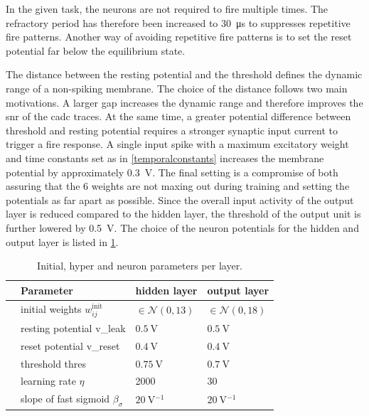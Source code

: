 In the given task, the neurons are not required to fire multiple times. The refractory period has therefore been increased to \SI{30}{\micro \s} to suppresses repetitive fire patterns. Another way of avoiding repetitive fire patterns is to set the reset potential far below the equilibrium state.

The distance between the resting potential and the threshold defines the dynamic range of a non-spiking membrane. The choice of the distance follows two main motivations. A larger gap increases the dynamic range and therefore improves the \gls{snr} of the \gls{cadc} traces. At the same time, a greater potential difference between threshold and resting potential requires a stronger synaptic input current to trigger a fire response. A single input spike with a maximum excitatory weight and time constants set as in \cref{temporalconstants} increases the membrane potential by approximately \SI{0.3}{\V}. The final setting is a compromise of both assuring that the \SI{6}{\bit} weights are not maxing out during training and setting the potentials as far apart as possible. Since the overall input activity of the output layer is reduced compared to the hidden layer, the threshold of the output unit is further lowered by \SI{0.5}{\V}. The choice of the neuron potentials for the hidden and output layer is listed in \cref{initparameters}.

\begin{table}[htb!]\centering{}
	\begin{tabular}{@{}rlll@{}}\toprule
		& Parameter								& 	hidden layer 			& 	output layer \\ \midrule
		& initial weights $w_{ij}^\text{init}$	& 	$\in \mathcal{N}(0,13)$ & 	$\in \mathcal{N}(0,18)$\\
		& resting potential \gls{v_leak}		&	$\SI{0.5}{\V}$ 			& 	$\SI{0.5}{\V}$\\
		& reset potential \gls{v_reset}			&	$\SI{0.4}{\V}$			& 	$\SI{0.4}{\V}$\\
		& threshold \gls{thres} 				&	$\SI{0.75}{\V}$			& 	$\SI{0.7}{\V}$\\
		& learning rate $\eta$ 					&	2000					& 	30			\\
		& slope of fast sigmoid $\beta_\sigma$ 	&	$\SI{20}{\V^{-1}}$		& 	$\SI{20}{\V^{-1}}$	\\
		\bottomrule
	\end{tabular}
	\caption[Initial, hyper and neuron parameters per layer.]{Initial, hyper and neuron parameters per layer.}
	\label{initparameters}
\end{table}

